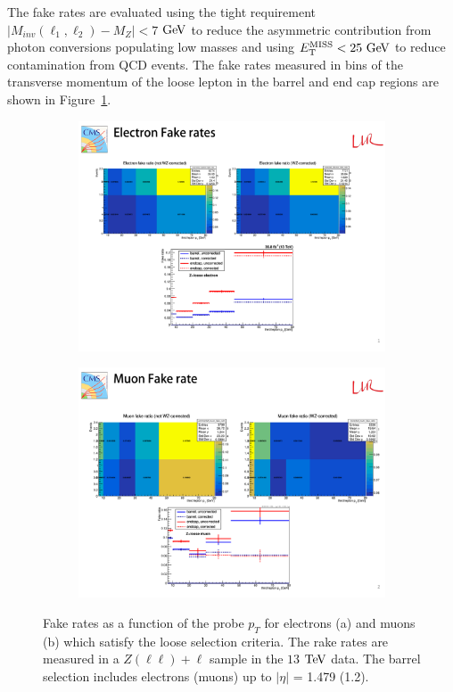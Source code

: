 The fake rates are evaluated using the tight requirement 
$|M_{inv}(\ell_{1},\ell_{2}) - M_{Z}| < 7 $ $\mathrm{Ge\kern -0.1em V}$ to reduce the asymmetric
contribution from photon conversions populating low masses and using $E_{\rm{T}}^{\rm{MISS}}<25\ \mathrm{Ge\kern -0.1em V}$ to reduce contamination from QCD events.
The fake rates measured in bins of the transverse momentum of the loose lepton in the barrel and end cap regions are shown in Figure~\ref{fig:os_fakerates}. 

\begin{figure}[tbh]
\centering
\begin{subfigure}{0.95\textwidth}
\centering
\includegraphics[width=4.25in]{Figures/RedBkg/FR_electrons_ptl3_DataallTR.pdf}
\caption{}
\end{subfigure}
\begin{subfigure}{0.95\textwidth}
\centering
\includegraphics[width=4.25in]{Figures/RedBkg/FR_muons_ptl3_DataallTR.pdf}
\caption{}
\end{subfigure}
  \caption{
Fake rates as a function of the probe $p_T$ for electrons (a) and muons (b) which satisfy the loose selection criteria. The rake rates are measured in
a $Z(\ell\ell)+\ell$ sample in the $13$ $\mathrm{Te\kern -0.1em V}$ data.
The barrel selection includes electrons (muons) up to $|\eta|$ = 1.479 (1.2).
}
\label{fig:os_fakerates}
\end{figure}

